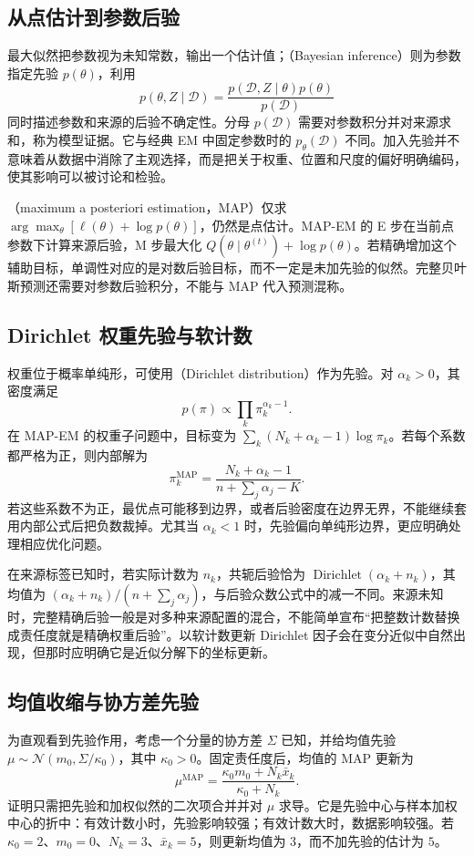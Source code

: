 \documentclass[UTF8]{ctexart}
\begin{document}
\subsection{从点估计到参数后验}
最大似然把参数视为未知常数，输出一个估计值；（Bayesian inference）则为参数指定先验 $p(\theta)$，利用
\[
p(\theta,Z\mid\mathcal D)=\frac{p(\mathcal D,Z\mid\theta)p(\theta)}{p(\mathcal D)}
\]
同时描述参数和来源的后验不确定性。分母 $p(\mathcal D)$ 需要对参数积分并对来源求和，称为模型证据。它与经典 EM 中固定参数时的 $p_\theta(\mathcal D)$ 不同。加入先验并不意味着从数据中消除了主观选择，而是把关于权重、位置和尺度的偏好明确编码，使其影响可以被讨论和检验。

（maximum a posteriori estimation，MAP）仅求 $\arg\max_\theta[\ell(\theta)+\log p(\theta)]$，仍然是点估计。MAP-EM 的 E 步在当前点参数下计算来源后验，M 步最大化 $Q(\theta\mid\theta^{(t)})+\log p(\theta)$。若精确增加这个辅助目标，单调性对应的是对数后验目标，而不一定是未加先验的似然。完整贝叶斯预测还需要对参数后验积分，不能与 MAP 代入预测混称。

\subsection{Dirichlet 权重先验与软计数}
权重位于概率单纯形，可使用（Dirichlet distribution）作为先验。对 $\alpha_k>0$，其密度满足
\[
p(\pi)\propto\prod_k\pi_k^{\alpha_k-1}.
\]
在 MAP-EM 的权重子问题中，目标变为 $\sum_k(N_k+\alpha_k-1)\log\pi_k$。若每个系数都严格为正，则内部解为
\begin{equation}
\pi_k^{\mathrm{MAP}}=\frac{N_k+\alpha_k-1}{n+\sum_j\alpha_j-K}.
\label{eq:gmm-map-weights}
\end{equation}
若这些系数不为正，最优点可能移到边界，或者后验密度在边界无界，不能继续套用内部公式后把负数裁掉。尤其当 $\alpha_k<1$ 时，先验偏向单纯形边界，更应明确处理相应优化问题。

在来源标签已知时，若实际计数为 $n_k$，共轭后验恰为 $\operatorname{Dirichlet}(\alpha_k+n_k)$，其均值为 $(\alpha_k+n_k)/(n+\sum_j\alpha_j)$，与后验众数公式中的减一不同。来源未知时，完整精确后验一般是对多种来源配置的混合，不能简单宣布“把整数计数替换成责任度就是精确权重后验”。以软计数更新 Dirichlet 因子会在变分近似中自然出现，但那时应明确它是近似分解下的坐标更新。

\subsection{均值收缩与协方差先验}
为直观看到先验作用，考虑一个分量的协方差 $\Sigma$ 已知，并给均值先验 $\mu\sim\mathcal N(m_0,\Sigma/\kappa_0)$，其中 $\kappa_0>0$。固定责任度后，均值的 MAP 更新为
\[
\mu^{\mathrm{MAP}}=\frac{\kappa_0m_0+N_k\bar x_k}{\kappa_0+N_k}.
\]
证明只需把先验和加权似然的二次项合并并对 $\mu$ 求导。它是先验中心与样本加权中心的折中：有效计数小时，先验影响较强；有效计数大时，数据影响较强。若 $\kappa_0=2$、$m_0=0$、$N_k=3$、$\bar x_k=5$，则更新均值为 $3$，而不加先验的估计为 $5$。
\end{document}
